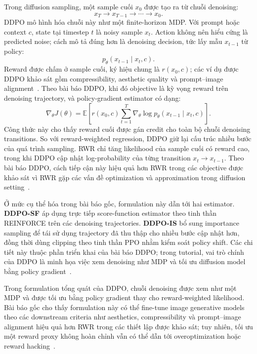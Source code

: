 Trong diffusion sampling, một sample cuối $x_0$ được tạo ra từ chuỗi denoising:
\[
    x_T \rightarrow x_{T-1} \rightarrow \cdots \rightarrow x_0.
\]
DDPO mô hình hóa chuỗi này như một finite-horizon MDP.
Với prompt hoặc context $c$, state tại timestep $t$ là noisy sample $x_t$.
Action không nên hiểu cứng là predicted noise; cách mô tả đúng hơn là denoising decision, tức lấy mẫu $x_{t-1}$ từ policy:
\begin{equation}
    p_\theta(x_{t-1}\mid x_t,c).
    \label{eq:tv2-ddpo-policy}
\end{equation}
Reward được chấm ở sample cuối, ký hiệu chung là $r(x_0,c)$; các ví dụ được DDPO khảo sát gồm compressibility, aesthetic quality và prompt--image alignment~\cite{black2024ddpo}.
Theo bài báo DDPO, khi đó objective là kỳ vọng reward trên denoising trajectory, và policy-gradient estimator có dạng:
\begin{equation}
    \nabla_\theta J(\theta)
    =
    \mathbb{E}
    \left[
        r(x_0,c)
        \sum_{t=1}^{T}
        \nabla_\theta
        \log p_\theta(x_{t-1}\mid x_t,c)
    \right].
    \label{eq:tv2-ddpo-gradient}
\end{equation}
Công thức này cho thấy reward cuối được gán credit cho toàn bộ chuỗi denoising transitions.
So với reward-weighted regression, DDPO giữ lại cấu trúc nhiều bước của quá trình sampling.
RWR chỉ tăng likelihood của sample cuối có reward cao, trong khi DDPO cập nhật log-probability của từng transition $x_t\rightarrow x_{t-1}$.
Theo bài báo DDPO, cách tiếp cận này hiệu quả hơn RWR trong các objective được khảo sát vì RWR gặp các vấn đề optimization và approximation trong diffusion setting~\cite{black2024ddpo}.

Ở mức cụ thể hóa trong bài báo gốc, formulation này dẫn tới hai estimator.
\textbf{DDPO-SF} áp dụng trực tiếp score-function estimator theo tinh thần REINFORCE trên các denoising trajectories.
\textbf{DDPO-IS} bổ sung importance sampling để tái sử dụng trajectory đã thu thập cho nhiều bước cập nhật hơn, đồng thời dùng clipping theo tinh thần PPO nhằm kiểm soát policy shift.
Các chi tiết này thuộc phần triển khai của bài báo DDPO; trong tutorial, vai trò chính của DDPO là minh họa việc xem denoising như MDP và tối ưu diffusion model bằng policy gradient~\cite{black2024ddpo}.

Trong formulation tổng quát của DDPO, chuỗi denoising được xem như một MDP và được tối ưu bằng policy gradient thay cho reward-weighted likelihood.
Bài báo gốc cho thấy formulation này có thể fine-tune image generative models theo các downstream criteria như aesthetics, compressibility và prompt--image alignment hiệu quả hơn RWR trong các thiết lập được khảo sát; tuy nhiên, tối ưu một reward proxy không hoàn chỉnh vẫn có thể dẫn tới overoptimization hoặc reward hacking~\cite{black2024ddpo,black2024ddpoproject}.


